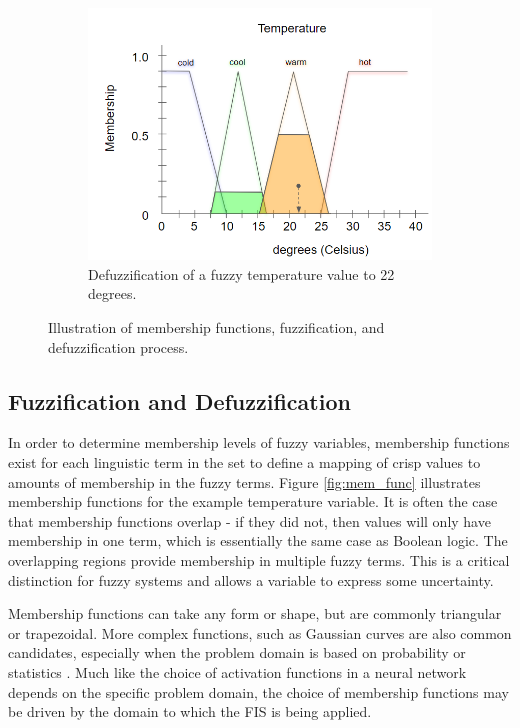 \documentclass[12pt]{report}
\begin{document}
\begin{figure}
    \begin{subfigure}{.5\linewidth}
        \includegraphics[width=\linewidth]{figure/defuzzification.png}
        \caption{Defuzzification of a fuzzy temperature value to 22 degrees.}
        \label{fig:defuzzification}
    \end{subfigure}
    \caption{Illustration of membership functions, fuzzification, and defuzzification process.}
    \label{fig:mem_fuzz_defuzz}
\end{figure}


\subsection{Fuzzification and Defuzzification}

In order to determine membership levels of fuzzy variables, membership functions exist for each linguistic term in the set to define a mapping of crisp values to amounts of membership in the fuzzy terms. Figure \ref{fig:mem_func} illustrates membership functions for the example temperature variable. It is often the case that membership functions overlap - if they did not, then values will only have membership in one term, which is essentially the same case as Boolean logic. The overlapping regions provide membership in multiple fuzzy terms. This is a critical distinction for fuzzy systems and allows a variable to express some uncertainty.

Membership functions can take any form or shape, but are commonly triangular or trapezoidal. More complex functions, such as Gaussian curves are also common candidates, especially when the problem domain is based on probability or statistics \cite{ali2015comparison}. Much like the choice of activation functions in a neural network depends on the specific problem domain, the choice of membership functions may be driven by the domain to which the FIS is being applied.
\end{document}
